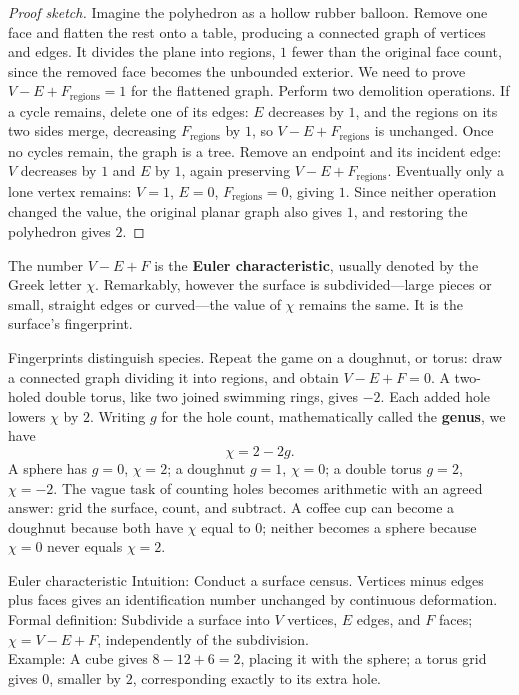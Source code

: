 \begin{proof}[Proof sketch]
Imagine the polyhedron as a hollow rubber balloon. Remove one face and flatten the rest onto a table, producing a connected graph of vertices and edges. It divides the plane into regions, $1$ fewer than the original face count, since the removed face becomes the unbounded exterior. We need to prove $V-E+F_{\text{regions}}=1$ for the flattened graph. Perform two demolition operations. If a cycle remains, delete one of its edges: $E$ decreases by $1$, and the regions on its two sides merge, decreasing $F_{\text{regions}}$ by $1$, so $V-E+F_{\text{regions}}$ is unchanged. Once no cycles remain, the graph is a tree. Remove an endpoint and its incident edge: $V$ decreases by $1$ and $E$ by $1$, again preserving $V-E+F_{\text{regions}}$. Eventually only a lone vertex remains: $V=1$, $E=0$, $F_{\text{regions}}=0$, giving $1$. Since neither operation changed the value, the original planar graph also gives $1$, and restoring the polyhedron gives $2$.
\end{proof}

The number $V-E+F$ is the \textbf{Euler characteristic}, usually denoted by the Greek letter $\chi$. Remarkably, however the surface is subdivided---large pieces or small, straight edges or curved---the value of $\chi$ remains the same. It is the surface's fingerprint.

Fingerprints distinguish species. Repeat the game on a doughnut, or torus: draw a connected graph dividing it into regions, and obtain $V-E+F=0$. A two-holed double torus, like two joined swimming rings, gives $-2$. Each added hole lowers $\chi$ by $2$. Writing $g$ for the hole count, mathematically called the \textbf{genus}, we have
\[
\chi = 2 - 2g.
\]
A sphere has $g=0$, $\chi=2$; a doughnut $g=1$, $\chi=0$; a double torus $g=2$, $\chi=-2$. The vague task of counting holes becomes arithmetic with an agreed answer: grid the surface, count, and subtract. A coffee cup can become a doughnut because both have $\chi$ equal to $0$; neither becomes a sphere because $\chi=0$ never equals $\chi=2$.

\begin{shuyu}{Euler characteristic}
Intuition: Conduct a surface census. Vertices minus edges plus faces gives an identification number unchanged by continuous deformation.\\
Formal definition: Subdivide a surface into $V$ vertices, $E$ edges, and $F$ faces; $\chi = V - E + F$, independently of the subdivision.\\
Example: A cube gives $8-12+6=2$, placing it with the sphere; a torus grid gives $0$, smaller by $2$, corresponding exactly to its extra hole.
\end{shuyu}

